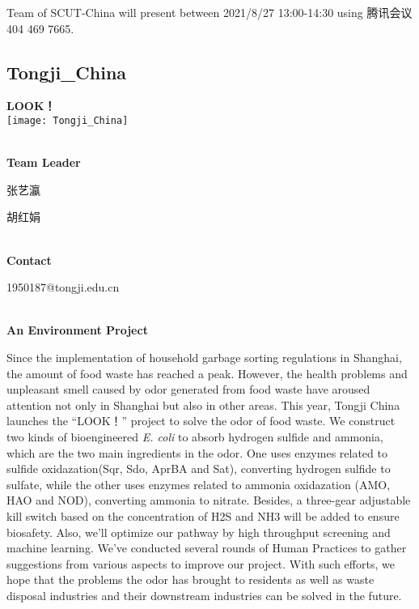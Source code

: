 Team of SCUT-China will present between 2021/8/27 13:00-14:30        using 腾讯会议 404 469 7665.
\newpage


\subsection{\textcolor{Blu}{ Tongji\_China } }
\vspace{5mm}
\begin{center}
\large{
  \textbf{ LOOK！ }\\

  \texttt{[image: Tongji\_China]}
}
\end{center}
\textbf{\\Team Leader}

  张艺瀛

  胡红娟


\textbf{\\Contact}

  1950187@tongji.edu.cn


\textbf{\\An Environment Project\\}\begin{spacing}{1.5}

Since the implementation of household garbage sorting regulations in Shanghai, the amount of food waste has reached a peak. However, the health problems and unpleasant smell caused by odor generated from food waste have aroused attention not only in Shanghai but also in other areas. This year, Tongji China launches the “LOOK！” project to solve the odor of food waste. We construct two kinds of bioengineered \textit{E. coli} to absorb hydrogen sulfide and ammonia, which are the two main ingredients in the odor. One uses enzymes related to sulfide oxidazation(Sqr, Sdo, AprBA and Sat), converting hydrogen sulfide to sulfate, while the other uses enzymes related to ammonia oxidazation (AMO, HAO and NOD), converting ammonia to nitrate. Besides, a three-gear adjustable kill switch based on the concentration of H2S and NH3 will be added to ensure biosafety. Also, we'll optimize our pathway by high throughput screening and machine learning. We've conducted several rounds of Human Practices to gather suggestions from various aspects to improve our project. With such efforts, we hope that the problems the odor has brought to residents as well as waste disposal industries and their downstream industries can be solved in the future.\end{spacing}
\\

